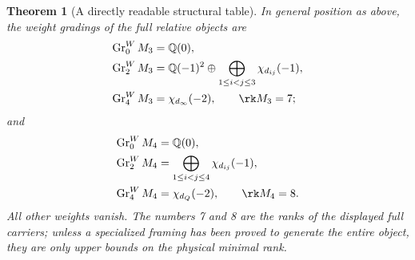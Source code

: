 \documentclass[11pt,a4paper,oneside]{article}
\theoremstyle{plain}
\newtheorem{theorem}{Theorem}[section]
\theoremstyle{definition}
\theoremstyle{remark}
\newcommand{\Q}{\mathbb Q}
\numberwithin{equation}{section}
\begin{document}
\begin{theorem}[A directly readable structural table]\label{unified:thm:onegraded}
In general position as above, the weight gradings of the full relative objects are
\begin{align}\label{unified:eq:trianglegraded}
 \operatorname{Gr}^W_0M_3&=\Q(0),\notag\\
 \operatorname{Gr}^W_2M_3&=\Q(-1)^2\oplus
                 \bigoplus_{1\le i<j\le3}\chi_{d_{ij}}(-1),\notag\\
 \operatorname{Gr}^W_4M_3&=\chi_{d_\infty}(-2),
 \qquad \rk M_3=7;
\end{align}
and
\begin{align}\label{unified:eq:boxgraded}
 \operatorname{Gr}^W_0M_4&=\Q(0),\notag\\
 \operatorname{Gr}^W_2M_4&=\bigoplus_{1\le i<j\le4}\chi_{d_{ij}}(-1),\notag\\
 \operatorname{Gr}^W_4M_4&=\chi_{d_Q}(-2),
 \qquad \rk M_4=8.
\end{align}
All other weights vanish. The numbers 7 and 8 are the ranks of the displayed \emph{full carriers};
unless a specialized framing has been proved to generate the entire object, they are only upper bounds on the physical minimal rank.
\end{theorem}
\end{document}
